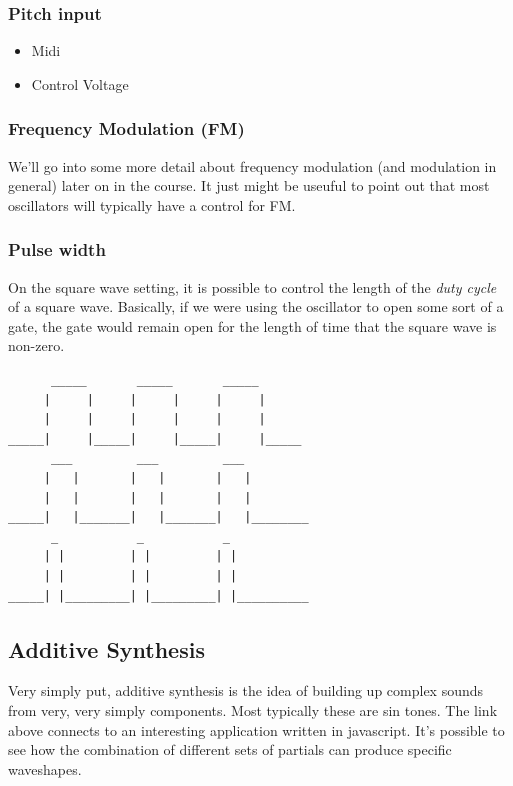 \documentclass[11pt]{article}
\begin{document}
\subsubsection{Pitch input}
\label{sec:org0a389cf}
\begin{itemize}
\item Midi
\item Control Voltage
\end{itemize}

\subsubsection{Frequency Modulation (FM)}
\label{sec:org76dbeba}
We'll go into some more detail about frequency modulation (and
modulation in general) later on in the course. It just might be
useuful to point out that most oscillators will typically have a
control for FM.

\subsubsection{Pulse width}
\label{sec:orgdaf8041}
On the square wave setting, it is possible to control the length of
the \emph{duty cycle} of a square wave. Basically, if we were using the
oscillator to open some sort of a gate, the gate would remain open for
the length of time that the square wave is non-zero. 

\begin{verbatim}
      _____       _____       _____
     |     |     |     |     |     |
     |     |     |     |     |     |
_____|     |_____|     |_____|     |_____
      ___         ___         ___
     |   |       |   |       |   |
     |   |       |   |       |   |
_____|   |_______|   |_______|   |________
      _           _           _
     | |         | |         | |
     | |         | |         | |
_____| |_________| |_________| |__________

\end{verbatim}

\subsection{Additive Synthesis}
\label{sec:org462176f}
Very simply put, additive synthesis is the idea of building up complex
sounds from very, very simply components. Most typically these are sin
tones. The link above connects to an interesting application written
in javascript. It's possible to see how the combination of different
sets of partials can produce specific waveshapes. 
\end{document}
